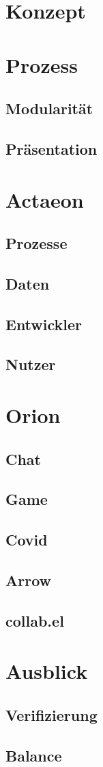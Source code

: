 \documentclass[11pt]{report}
\begin{document}
\part{Konzept}
\label{sec:orgb9d2675}
\part{Prozess}
\label{sec:org521258f}
\chapter{Modularität}
\label{sec:org294c90e}
\chapter{Präsentation}
\label{sec:orga8429f6}
\part{Actaeon}
\label{sec:org8610194}
\chapter{Prozesse}
\label{sec:orgf5475af}
\chapter{Daten}
\label{sec:org17a9fe0}
\chapter{Entwickler}
\label{sec:org13cbe6d}
\chapter{Nutzer}
\label{sec:orga4beafd}
\part{Orion}
\label{sec:org4b39ee6}
\chapter{Chat}
\label{sec:org09d8eac}
\chapter{Game}
\label{sec:orgca1d4bd}
\chapter{Covid}
\label{sec:orgaaf660d}
\chapter{Arrow}
\label{sec:org6003d5f}
\chapter{collab.el}
\label{sec:org28eee6c}
\part{Ausblick}
\label{sec:orgad0a543}
\chapter{Verifizierung}
\label{sec:org4bd4376}
\chapter{Balance}
\label{sec:org91673a6}
\end{document}
